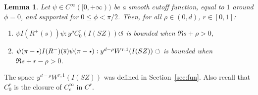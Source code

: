 \documentclass[10pt]{amsart}
\newcommand{\sbullet}{{\scriptscriptstyle\bullet}}
\newcommand{\csbullet}{{\raisebox{1pt}{$\sbullet$}}}
\newcommand{\ZZ}{I(SZ)}
\theoremstyle{plain}
\newtheorem{lemma}{Lemma}[section]
\theoremstyle{definition}
\begin{document}
\begin{lemma}\label{lemma:boundedness-resolvent-in-cusp}
Let $\psi \in C^\infty([0,+\infty))$ be a smooth cutoff function, equal to $1$ around $\phi=0$, and supported for $0 \leq \phi<\pi/2$. Then, for all $\rho\in (0,d)$, $r \in [0,1]$:
\begin{enumerate}
\item\label{lemma:boundedness-resolvent-in-cusp1} $\psi I(R^+(s)) \psi : y^\rho C^r_0(\ZZ) \circlearrowleft$ is bounded when $\Re s + \rho>0$,
\item\label{lemma:boundedness-resolvent-in-cusp2} $\psi(\pi-\csbullet) I(R^-)(\overline{s}) \psi(\pi-\csbullet) : y^{d-\rho} W^{r,1}(\ZZ) \circlearrowleft$ is bounded when $\Re s + r-\rho>0$.
\end{enumerate}
\end{lemma}
The space $y^{d-\rho} W^{r,1}(\ZZ)$ was defined in Section~\ref{sec:fun}. Also recall that $C^r_0$ is the closure of $C^\infty_c$ in $C^r$.
\end{document}
